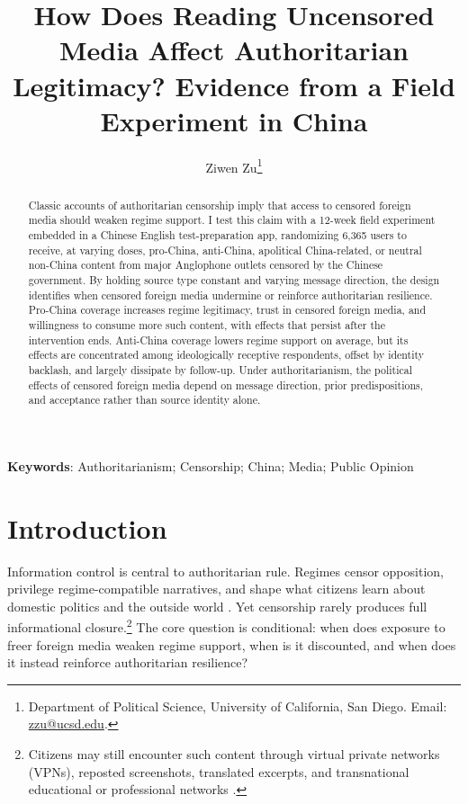 \documentclass[12pt,american]{article}
\title{\textbf{How Does Reading Uncensored Media Affect Authoritarian Legitimacy? Evidence from a Field Experiment in China}}
\author{Ziwen Zu\thanks{Department of Political Science, University of California, San Diego. Email: \href{mailto:zzu@ucsd.edu}{zzu@ucsd.edu}.}}
\date{}
\begin{document}
	\hypersetup{pageanchor=false}
	\maketitle
	\thispagestyle{empty}
	
	\begin{abstract}
		\noindent Classic accounts of authoritarian censorship imply that access to censored foreign media should weaken regime support. I test this claim with a 12-week field experiment embedded in a Chinese English test-preparation app, randomizing 6,365 users to receive, at varying doses, pro-China, anti-China, apolitical China-related, or neutral non-China content from major Anglophone outlets censored by the Chinese government. By holding source type constant and varying message direction, the design identifies when censored foreign media undermine or reinforce authoritarian resilience. Pro-China coverage increases regime legitimacy, trust in censored foreign media, and willingness to consume more such content, with effects that persist after the intervention ends. Anti-China coverage lowers regime support on average, but its effects are concentrated among ideologically receptive respondents, offset by identity backlash, and largely dissipate by follow-up. Under authoritarianism, the political effects of censored foreign media depend on message direction, prior predispositions, and acceptance rather than source identity alone.
	\end{abstract}
	
	
	
	\textbf{Keywords}: Authoritarianism; Censorship; China; Media; Public Opinion
	
	\setcounter{page}{0}
	\thispagestyle{empty}
	\newpage
	\doublespacing
	\setcounter{page}{1}
	\renewcommand{\thepage}{\arabic{page}}
	\hypersetup{pageanchor=true}
	
	\section*{Introduction}
	
	Information control is central to authoritarian rule. Regimes censor opposition, privilege regime-compatible narratives, and shape what citizens learn about domestic politics and the outside world \citep{BesleyPrat2006,gurievtreisman2019,huang2015signal,kingpanroberts2013,roberts2018,Roberts2020ARPS,stockmann2013}. Yet censorship rarely produces full informational closure.\footnote{Citizens may still encounter such content through virtual private networks (VPNs), reposted screenshots, translated excerpts, and transnational educational or professional networks \citep{chenyang2019,DalNisbet2022SMS,hobbsroberts2018,PanSiegel2020APSR,Roberts2020ARPS}.} The core question is conditional: when does exposure to freer foreign media weaken regime support, when is it discounted, and when does it instead reinforce authoritarian resilience?
	
\end{document}
